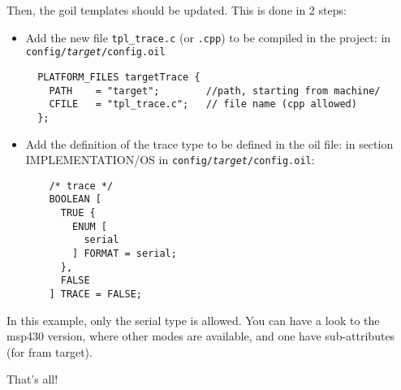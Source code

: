 Then, the goil templates should be updated. This is done in 2 steps:

\begin{itemize}
	\item Add the new file \texttt{tpl\_trace.c} (or \texttt{.cpp}) to be compiled in the project: in \texttt{config/\textit{target}/config.oil} \\

\lstset{language=OIL}
\begin{lstlisting}
  PLATFORM_FILES targetTrace {
    PATH    = "target";        //path, starting from machine/
    CFILE   = "tpl_trace.c";   // file name (cpp allowed)
  };
\end{lstlisting}

	\item Add the definition of the trace type to be defined in the oil file: in section IMPLEMENTATION/OS in \texttt{config/\textit{target}/config.oil}:
\begin{lstlisting}
    /* trace */
    BOOLEAN [
      TRUE {
        ENUM [
          serial
        ] FORMAT = serial;
      },
      FALSE
    ] TRACE = FALSE;
\end{lstlisting}
\end{itemize}

In this example, only the serial type is allowed. You can have a look to the msp430 version, where other modes are available, and one have sub-attributes (for fram target).

That's all!
